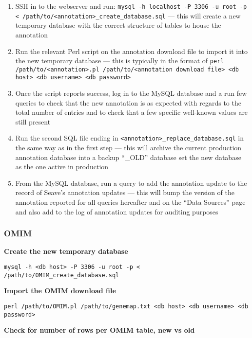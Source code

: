 \documentclass[11pt, a4paper]{article}
\begin{document}
\begin{enumerate}
	\item SSH in to the webserver and run: \texttt{mysql -h localhost -P 3306 -u root -p < /path/to/<annotation>\_create\_database.sql} --- this will create a new temporary database with the correct structure of tables to house the annotation
	\item Run the relevant Perl script on the annotation download file to import it into the new temporary database --- this is typically in the format of \texttt{perl /path/to/<annotation>.pl /path/to/<annotation download file> <db host> <db username> <db password>}
	\item Once the script reports success, log in to the MySQL database and a run few queries to check that the new annotation is as expected with regards to the total number of entries and to check that a few specific well-known values are still present
	\item Run the second SQL file ending in \texttt{<annotation>\_replace\_database.sql} in the same way as in the first step --- this will archive the current production annotation database into a backup ``\_OLD'' database set the new database as the one active in production
	\item From the MySQL database, run a query to add the annotation update to the record of Seave's annotation updates --- this will bump the version of the annotation reported for all queries hereafter and on the ``Data Sources'' page and also add to the log of annotation updates for auditing purposes
\end{enumerate}

\subsubsection{OMIM}

\textbf{Create the new temporary database}

\texttt{mysql -h <db host> -P 3306 -u root -p < /path/to/OMIM\_create\_database.sql}

\textbf{Import the OMIM download file}

\texttt{perl /path/to/OMIM.pl /path/to/genemap.txt <db host> <db username> <db password>}

\textbf{Check for number of rows per OMIM table, new vs old}
\end{document}
